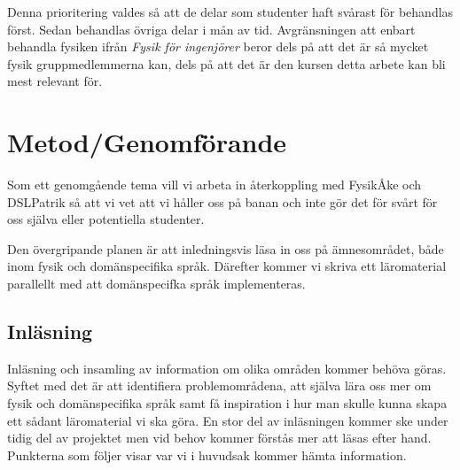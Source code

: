 \documentclass[12pt,a4paper]{article}
\begin{document}
Denna prioritering valdes så att de delar som studenter haft svårast för behandlas först.
%
Sedan behandlas övriga delar i mån av tid. Avgränsningen att enbart behandla fysiken ifrån \textit{Fysik för ingenjörer} beror dels på att det är så mycket fysik gruppmedlemmerna kan, dels på att det är den kursen detta arbete kan bli mest relevant för.





\section{Metod/Genomförande}

Som ett genomgående tema vill vi arbeta in återkoppling med FysikÅke och DSLPatrik så att vi vet att vi håller oss på banan och inte gör det för svårt för oss själva eller potentiella studenter.

Den övergripande planen är att inledningsvis läsa in oss på ämnesområdet, både inom fysik och domänspecifika språk. Därefter kommer vi skriva ett läromaterial parallellt med att domänspecifka språk implementeras.

\subsection{Inläsning}

Inläsning och insamling av information om olika områden kommer behöva göras. Syftet med det är att identifiera problemområdena, att själva lära oss mer om fysik och domänspecifika språk samt få inspiration i hur man skulle kunna skapa ett sådant läromaterial vi ska göra. En stor del av inläsningen kommer ske under tidig del av projektet men vid behov kommer förstås mer att läsas efter hand. Punkterna som följer visar var vi i huvudsak kommer hämta information.
\end{document}
